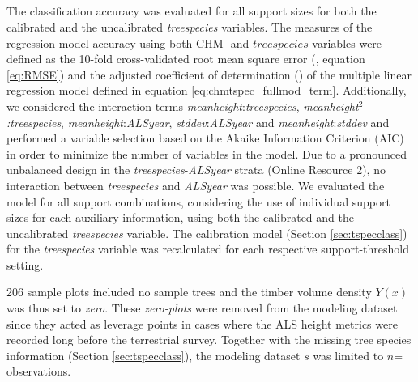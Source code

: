 \subsection{}
\label{sec:modval}

 The classification accuracy was evaluated for all support sizes for both the calibrated and the uncalibrated \textit{treespecies} variables. The measures of the regression model accuracy using both CHM- and $treespecies$ variables were defined as the 10-fold cross-validated root mean square error (\rmsecv{}, equation \ref{eq:RMSE}) and the adjusted coefficient of determination (\adjrsq{}) of the multiple linear regression model defined in equation \ref{eq:chmtspec_fullmod_term}. Additionally, we considered the interaction terms \textit{meanheight}:\textit{treespecies}, \textit{meanheight$^{2}$:treespecies}, \textit{meanheight}:\textit{ALSyear}, \textit{stddev}:\textit{ALSyear} and \textit{meanheight}:\textit{stddev} and performed a variable selection based on the Akaike Information Criterion (AIC) \citep{Akaike2011} in order to minimize the number of variables in the model. Due to a pronounced unbalanced design in the \textit{treespecies}-\textit{ALSyear} strata (Online Resource 2), no interaction between \textit{treespecies} and \textit{ALSyear} was possible. We evaluated the model for all support combinations, considering the use of individual support sizes for each auxiliary information, using both the calibrated and the uncalibrated \textit{treespecies} variable. The calibration model (Section \ref{sec:tspecclass}) for the \textit{treespecies} variable was recalculated for each respective support-threshold setting.\par

206 sample plots included no sample trees and the timber volume density $Y(x)$ was thus set to \textit{zero}. These \textit{zero-plots} were removed from the modeling dataset since they acted as leverage points in cases where the ALS height metrics were recorded long before the terrestrial survey. Together with the missing tree species information (Section \ref{sec:tspecclass}), the modeling dataset $s$ was limited to $n$= observations.


